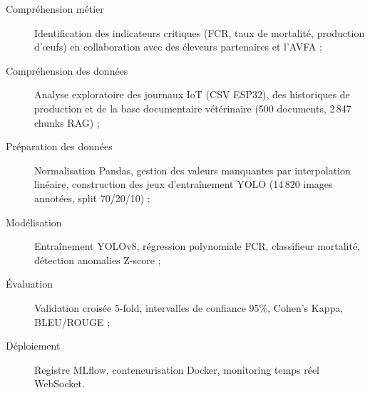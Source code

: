 \begin{description}
  \item[Compréhension métier] Identification des indicateurs critiques
  (FCR, taux de mortalité, production d'œufs) en collaboration avec des
  éleveurs partenaires et l'AVFA ;
  \item[Compréhension des données] Analyse exploratoire des journaux IoT
  (CSV ESP32), des historiques de production et de la base documentaire
  vétérinaire (500 documents, 2\,847 chunks RAG) ;
  \item[Préparation des données] Normalisation Pandas, gestion des
  valeurs manquantes par interpolation linéaire, construction des jeux
  d'entraînement YOLO (14\,820 images annotées, split 70/20/10) ;
  \item[Modélisation] Entraînement YOLOv8, régression polynomiale FCR,
  classifieur mortalité, détection anomalies Z-score ;
  \item[Évaluation] Validation croisée 5-fold, intervalles de confiance
  95\%, Cohen's Kappa, BLEU/ROUGE ;
  \item[Déploiement] Registre MLflow, conteneurisation Docker, monitoring
  temps réel WebSocket.
\end{description}

